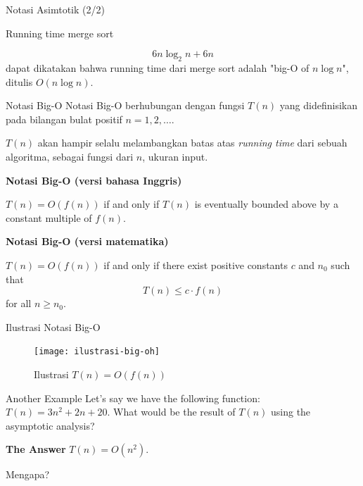 \documentclass[pdf]{beamer}
\theoremstyle{mystyle}
\begin{document}
\begin{frame}{Notasi Asimtotik (2/2)}

	Running time merge sort 
	
	\begin{equation*}
		6n \log_2{n} + 6n
	\end{equation*}
	dapat dikatakan bahwa running time dari merge sort adalah "big-O of $n \log n$", ditulis $O(n \log n)$.

\end{frame}

\begin{frame}{Notasi Big-O}
	Notasi Big-O berhubungan dengan fungsi $T(n)$ yang didefinisikan pada bilangan bulat positif $n = 1, 2, \ldots$.
	
	\bigskip	
	
	$T(n)$ akan hampir selalu melambangkan batas atas \textit{running time} dari sebuah algoritma, sebagai fungsi dari $n$, ukuran input. 
	
	\bigskip
	
	\textbf{Notasi Big-O (versi bahasa Inggris)}
	\begin{center}
			$T(n) = O(f(n))$ if and only if $T(n)$ is eventually bounded above by a constant multiple of $f(n)$. 
	\end{center}		
	
	\textbf{Notasi Big-O (versi matematika)}
	\begin{center}
			$T(n) = O(f(n))$ if and only if there exist positive constants $c$ and $n_0$ such that
				\begin{equation*}
					T(n) \leq c \cdot f(n)
				\end{equation*}
			for all $n \geq n_0$.
	\end{center}			
\end{frame}

\begin{frame}{Ilustrasi Notasi Big-O}
	\begin{figure}[!ht]
		\centering
		\texttt{[image: ilustrasi-big-oh]}
		\caption{Ilustrasi $T(n) = O(f(n))$~\citep{roughgarden2017illuminatedpart1}}
	\end{figure}
\end{frame}


\begin{frame}{Another Example}
	Let's say we have the following function: $T(n) = 3n^2+2n+20$. What would be the result of $T(n)$ using the asymptotic analysis?
	
	\bigskip
	
	\begin{block}{\textbf{The Answer}}
		$T(n) = O(n^2)$.
	\end{block}
	
	\begin{center}
		Mengapa?
	\end{center}
\end{frame}
\end{document}
